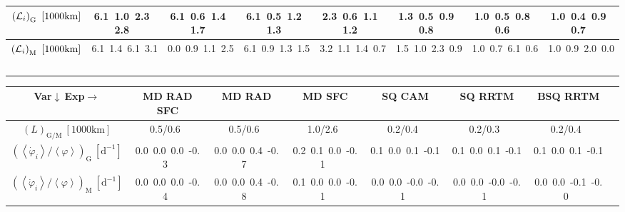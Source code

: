 \begin{table}[H]
{\begin{centering}
\begin{tabular}{|c|c|c|c|c|c|c|c|}
\hline
$\left({\cal L}_{i}\right)_{\mathrm{G}}\ \left[1000\mathrm{km}\right]$ & \textcolor{C1}{6.1}\ \textcolor{C2}{1.0}\ \textcolor{C3}{2.3}\ \textcolor{C4}{2.8}\  & \textcolor{C1}{6.1}\ \textcolor{C2}{0.6}\ \textcolor{C3}{1.4}\ \textcolor{C4}{1.7}\  & \textcolor{C1}{6.1}\ \textcolor{C2}{0.5}\ \textcolor{C3}{1.2}\ \textcolor{C4}{1.3}\  & \textcolor{C1}{2.3}\ \textcolor{C2}{0.6}\ \textcolor{C3}{1.1}\ \textcolor{C4}{1.2}\  & \textcolor{C1}{1.3}\ \textcolor{C2}{0.5}\ \textcolor{C3}{0.9}\ \textcolor{C4}{0.8}\  & \textcolor{C1}{1.0}\ \textcolor{C2}{0.5}\ \textcolor{C3}{0.8}\ \textcolor{C4}{0.6}\  & \textcolor{C1}{1.0}\ \textcolor{C2}{0.4}\ \textcolor{C3}{0.9}\ \textcolor{C4}{0.7}\  \tabularnewline
\hline
$\left({\cal L}_{i}\right)_{\mathrm{M}}\ \left[1000\mathrm{km}\right]$ & \textcolor{C1}{6.1}\ \textcolor{C2}{1.4}\ \textcolor{C3}{6.1}\ \textcolor{C4}{3.1}\  & \textcolor{C1}{0.0}\ \textcolor{C2}{0.9}\ \textcolor{C3}{1.1}\ \textcolor{C4}{2.5}\  & \textcolor{C1}{6.1}\ \textcolor{C2}{0.9}\ \textcolor{C3}{1.3}\ \textcolor{C4}{1.5}\  & \textcolor{C1}{3.2}\ \textcolor{C2}{1.1}\ \textcolor{C3}{1.4}\ \textcolor{C4}{0.7}\  & \textcolor{C1}{1.5}\ \textcolor{C2}{1.0}\ \textcolor{C3}{2.3}\ \textcolor{C4}{0.9}\  & \textcolor{C1}{1.0}\ \textcolor{C2}{0.7}\ \textcolor{C3}{6.1}\ \textcolor{C4}{0.6}\  & \textcolor{C1}{1.0}\ \textcolor{C2}{0.9}\ \textcolor{C3}{2.0}\ \textcolor{C4}{0.0}\  \tabularnewline
\hline
 &  &  &  &  &  &  & \tabularnewline
\hline
\end{tabular}
\begin{tabular}{|c|c|c|c|c|c|c|c|}
\hline
Var$\downarrow\ $Exp$\rightarrow$ & MD RAD SFC & MD RAD & MD SFC & SQ CAM & SQ RRTM & BSQ RRTM \tabularnewline
\hline
\hline
$\left(L\right)_{\mathrm{G/M}}\ \left[1000\mathrm{km}\right]$ & 0.5/0.6\ & 0.5/0.6\ & 1.0/2.6\ & 0.2/0.4\ & 0.2/0.3\ & 0.2/0.4\ \tabularnewline
\hline
$\left(\left\langle \dot{\varphi}_{i}\right\rangle /\left\langle \varphi\right\rangle\right) _{\mathrm{G}}\ \left[\mathrm{d^{-1}}\right]$ & \textcolor{C1}{0.0}\ \textcolor{C2}{0.0}\ \textcolor{C3}{0.0}\ \textcolor{C4}{-0.3}\  & \textcolor{C1}{0.0}\ \textcolor{C2}{0.0}\ \textcolor{C3}{0.4}\ \textcolor{C4}{-0.7}\  & \textcolor{C1}{0.2}\ \textcolor{C2}{0.1}\ \textcolor{C3}{0.0}\ \textcolor{C4}{-0.1}\  & \textcolor{C1}{0.1}\ \textcolor{C2}{0.0}\ \textcolor{C3}{0.1}\ \textcolor{C4}{-0.1}\  & \textcolor{C1}{0.1}\ \textcolor{C2}{0.0}\ \textcolor{C3}{0.1}\ \textcolor{C4}{-0.1}\  & \textcolor{C1}{0.1}\ \textcolor{C2}{0.0}\ \textcolor{C3}{0.1}\ \textcolor{C4}{-0.1}\  \tabularnewline
\hline
$\left(\left\langle \dot{\varphi}_{i}\right\rangle /\left\langle \varphi\right\rangle\right) _{\mathrm{M}}\ \left[\mathrm{d^{-1}}\right]$ & \textcolor{C1}{0.0}\ \textcolor{C2}{0.0}\ \textcolor{C3}{0.0}\ \textcolor{C4}{-0.4}\  & \textcolor{C1}{0.0}\ \textcolor{C2}{0.0}\ \textcolor{C3}{0.4}\ \textcolor{C4}{-0.8}\  & \textcolor{C1}{0.1}\ \textcolor{C2}{0.0}\ \textcolor{C3}{0.0}\ \textcolor{C4}{-0.1}\  & \textcolor{C1}{0.0}\ \textcolor{C2}{0.0}\ \textcolor{C3}{-0.0}\ \textcolor{C4}{-0.1}\  & \textcolor{C1}{0.0}\ \textcolor{C2}{0.0}\ \textcolor{C3}{-0.0}\ \textcolor{C4}{-0.1}\  & \textcolor{C1}{0.0}\ \textcolor{C2}{0.0}\ \textcolor{C3}{-0.1}\ \textcolor{C4}{-0.0}\  \tabularnewline

\end{tabular}
\end{centering}}
\end{table}
